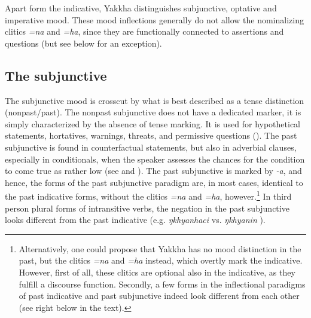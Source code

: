 Apart form the indicative, Yakkha distinguishes subjunctive, optative and  imperative mood. These mood inflections generally do not allow the nominalizing clitics \emph{=na} and \emph{=ha}, since they are functionally connected to assertions and questions (but see below for an exception).

\subsection{The subjunctive}

The subjunctive mood is crosscut by what is best described as a tense distinction (nonpast/past). The nonpast subjunctive does not have a dedicated marker, it is simply characterized by the absence of tense marking. It is used for hypothetical statements, hortatives, warnings, threats, and permissive questions (). The past subjunctive is found in counterfactual statements, but also in adverbial clauses, especially in conditionals, when the speaker assesses the chances for the condition to come true as rather low (see  and ). The past subjunctive is marked by \emph{-a}, and hence, the forms of the past subjunctive paradigm are, in most cases, identical to the past indicative forms, without the clitics \emph{=na} and \emph{=ha}, however.\footnote{Alternatively, one could propose that Yakkha has no mood distinction in the past, but the clitics  \emph{=na} and \emph{=ha} instead, which overtly mark the indicative. However, first of all, these clitics are optional also in the indicative, as they fulfill a discourse function. Secondly, a few forms in the inflectional paradigms of past indicative and past subjunctive indeed look different from each other (see right below in the text).} In third person plural forms of intransitive verbs, the negation in the past subjunctive looks different from the past indicative (e.g. \emph{ŋkhyanhaci}  vs. \emph{ŋkhyanin} ). 


